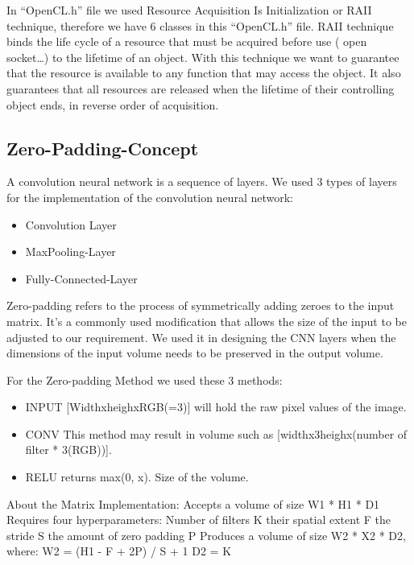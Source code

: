 \documentclass[parskip=full]{scrartcl}
\begin{document}
In “OpenCL.h” file we used Resource Acquisition Is Initialization or RAII technique, therefore we have 6 classes in this “OpenCL.h” file. 
RAII technique binds the life cycle of a resource that must be acquired before use ( open socket…) to the lifetime of an object. 
With this technique we want to guarantee that the resource is available to any function that may access the object. It also guarantees that all resources are released when the lifetime of their controlling object ends, in reverse order of acquisition.
 
\pagebreak

\subsection{Zero-Padding-Concept}

A convolution neural network is a sequence of layers. We used 3 types of layers for the implementation of the convolution neural network:

\begin {itemize}
	\item Convolution Layer
	\item MaxPooling-Layer
	\item Fully-Connected-Layer
\end{itemize}

Zero-padding refers to the process of symmetrically adding zeroes to the input matrix. 
It's a commonly used modification that allows the size of the input to be adjusted to our requirement. We used it in designing the CNN layers when the dimensions of the input volume needs to be preserved in the output volume.

For the Zero-padding Method we used these 3 methods:
\begin {itemize}
	\item INPUT [WidthxheighxRGB(=3)] will hold the raw pixel values of the image.
	\item CONV This method may result in volume such as [widthx3heighx(number of filter * 3(RGB))].
	\item RELU returns max(0, x). Size of the volume.
\end {itemize}
    
About the Matrix Implementation:
Accepts a volume of size W1 * H1 * D1
Requires four hyperparameters: 
Number of filters K
their spatial extent F
the stride S
the amount of zero padding P
Produces a volume of size W2 * X2 * D2, where:
W2 = (H1 - F + 2P) / S + 1
D2 = K
\end{document}
